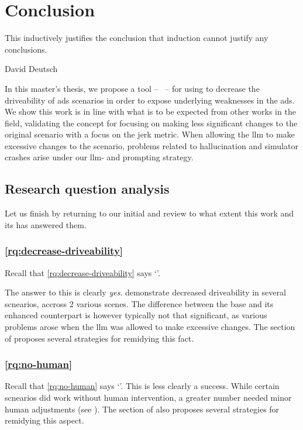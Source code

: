 \chapter{Conclusion}\label{chp:conclusion}

\epigraph{This inductively justifies the conclusion that induction cannot justify any conclusions.}{David Deutsch}

In this master's thesis, we propose a tool -- \hefe{}~-- for using  to decrease the
driveability of \acrfull{ads} scenarios in order to expose underlying weaknesses in the
\acrshort{ads}. We show this work is in line with what is to be expected from other works in the
field, validating the concept for focusing on making less significant changes to the original
scenario with a focus on the jerk metric. When allowing the \acrshort{llm} to make excessive changes
to the scenario, problems related to hallucination and simulator crashes arise under our
\acrshort{llm}- and prompting strategy.

\section{Research question analysis}

Let us finish by returning to our initial  and review to what
extent this work and its  has answered them.

\subsection{\ref{rq:decrease-driveability}}

Recall that \ref{rq:decrease-driveability} says `'.

The answer to this is clearly \emph{yes}.  demonstrate
decreased driveability in several scnearios, accross 2 various scenes. The difference between the
base and its enhanced counterpart is however typically not that significant, as various problems
arose when the \acrshort{llm} was allowed to make excessive changes. The  section of
 proposes several strategies for remidying this fact.

\subsection{\ref{rq:no-human}}

Recall that \ref{rq:no-human} says `'. This is less clearly a success. While
certain scnearios did work without human intervention, a greater number needed minor human
adjustments (see ). The  section of  also proposes several strategies for remidying this aspect.

